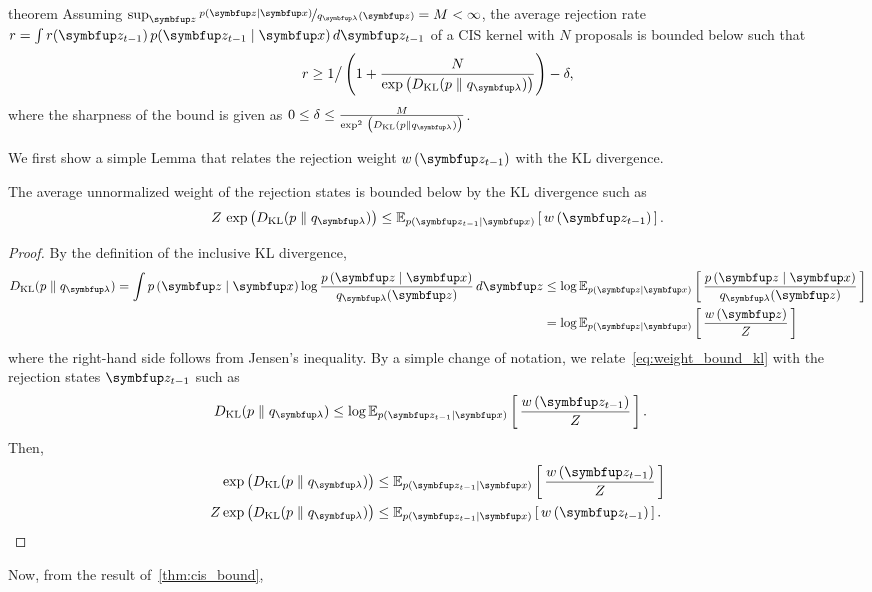 
\begin{theoremEnd}[]{theorem}\label{thm:cis_bound_kl}
  Assuming \(\sup_{\vz} \nicefrac{p(\vz\mid\vx)}{q_{\vlambda}(\vz)} = M < \infty\), the average rejection rate \(r = \int r(\vz_{t-1}) \, p(\vz_{t-1}\mid\vx) \, d\vz_{t-1} \) of a CIS kernel with \(N\) proposals is bounded below such that
  \[
  r \geq 1 \big/ 
    \left(1 + \frac{N}{
      \exp\big(\DKL{p}{q_{\vlambda}}\big)
    }
    \right) - \delta,
  \]
  where the sharpness of the bound is given as \(
  0 \leq \delta \leq \frac{M}{\exp^2\,\big( \DKL{p}{q_{\vlambda}}\big) }
  \).
\end{theoremEnd}
\begin{proofEnd}
  We first show a simple Lemma that relates the rejection weight \(w\,(\vz_{t-1})\) with the KL divergence.
  \begin{framedlemma}\label{thm:rej_kl_bound}
    The average unnormalized weight of the rejection states is bounded below by the KL divergence such as
    \[
    Z\,\exp\big(\DKL{p}{q_{\vlambda}}\big) \leq \Esub{p(\vz_{t-1}\mid\vx)}{w\,(\vz_{t-1})}.
    \]
  \begin{proof}
    By the definition of the inclusive KL divergence,
    \begin{align}
      \DKL{p}{q_{\vlambda}} = \int p\,(\vz\mid\vx) \log \frac{p\,(\vz\mid\vx)}{q_{\vlambda}(\vz)} \, d\vz
      &\leq \log \Esub{p(\vz\mid\vx)}{\frac{p\,(\vz\mid\vx)}{q_{\vlambda}(\vz)}} \\
      &= \log \Esub{p(\vz\mid\vx)}{ \frac{w\,(\vz)}{Z} } \label{eq:weight_bound_kl}
    \end{align}
    where the right-hand side follows from Jensen's inequality.
    By a simple change of notation, we relate~\eqref{eq:weight_bound_kl} with the rejection states \(\vz_{t-1}\) such as
    \begin{align}
      \DKL{p}{q_{\vlambda}} &\leq \log \Esub{p(\vz_{t-1}\mid\vx)}{\frac{w\,(\vz_{t-1})}{Z}}.
    \end{align}
    Then,
    \begin{align}
      \exp\big(\DKL{p}{q_{\vlambda}}\big) &\leq \Esub{p(\vz_{t-1}\mid\vx)}{
        \frac{w\,(\vz_{t-1})}{Z}} \\
      Z \exp\big(\DKL{p}{q_{\vlambda}}\big) &\leq \Esub{p(\vz_{t-1}\mid\vx)}{w\,(\vz_{t-1})}.
    \end{align}
  \end{proof}
  \end{framedlemma}
  Now, from the result of~\cref{thm:cis_bound},
  \begin{equation}

\end{equation}
\end{proofEnd}
